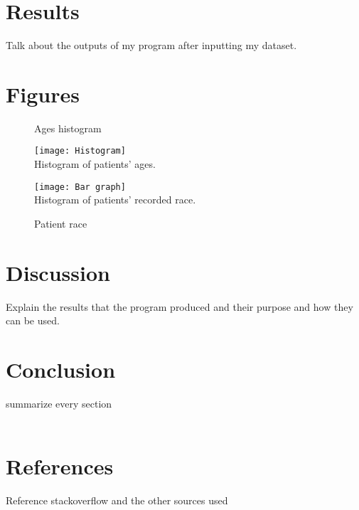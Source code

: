\documentclass{article}
\begin{document}
\section{Results}
Talk about the outputs of my program after inputting my dataset.
\newpage
\section{Figures}
\begin{figure}[h]
	\caption{Ages histogram\label{fig:Histogram}}
	\centering
	\texttt{[image: Histogram]}
\\Histogram of patients' ages.
	\caption{Patient race\label{fig:Bar graph}}
	\centering
	\texttt{[image: Bar graph]}
\\Histogram of patients' recorded race.
\end{figure}
\newpage
\section{Discussion}
Explain the results that the program produced and their purpose and how they can be used.

\section{Conclusion}
summarize every section\\\\

\section{References}
Reference stackoverflow and the other sources used\\\\
\end{document}

